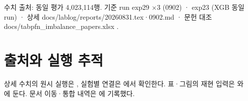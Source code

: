 수치 출처: 동일 평가 4,023,114행. 기준 run exp29 ×3 (0902) · exp23 (XGB 동일 run) · 상세 docs/\allowbreak{}lablog/\allowbreak{}reports/\allowbreak{}20260831.tex·0902.md · 문헌 대조 docs/\allowbreak{}tabpfn\_\allowbreak{}imbalance\_\allowbreak{}papers.xlsx .



\section*{출처와 실행 추적}

상세 수치의 원시 실행은 , 실험별 연결은 에서 확인한다. 표·그림의 재현 입력은 와 에 둔다. 문서 이동·통합 내역은 에 기록했다.



